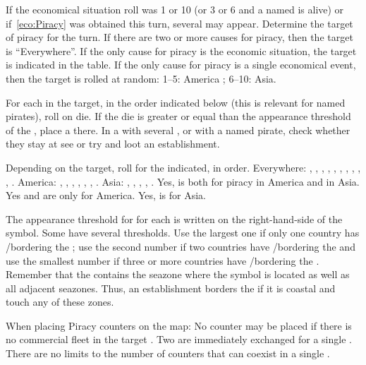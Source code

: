 \aparag If the economical situation roll was 1 or 10 (or 3 or 6 and a
named  \LeaderP is alive) or if~\ref{eco:Piracy} was
obtained this turn, several \PIRATE may appear. Determine the target of
piracy for the turn.
\bparag If there are two or more causes for piracy, then the target is
``Everywhere''.
\bparag If the only cause for piracy is the economic situation, the
target is indicated in the table.
\bparag If the only cause for piracy is a single economical event, then
the target is rolled at random: 1--5: America ; 6--10: Asia.

\aparag For each \STZ in the target, in the order indicated below (this
is relevant for named pirates), roll on die. If the die is greater or
equal than the appearance threshold of the \STZ, place a
\PIRATE\facemoins there.
\bparag In a \STZ with several \PIRATE\faceplus, or with a named pirate,
check whether they stay at see or try and loot an establishment.

 Depending on the target, roll for the \STZ
indicated, in order.
\bparag Everywhere: , , ,
, , , , ,
, , .
\bparag America: , , ,
, , , .
\bparag Asia: , , , ,
.
\bparag Yes,  is both for piracy in America and in
Asia. Yes  and  are only for America. Yes,
 is for Asia.

\label{chEvents:Piracy Level}
The appearance threshold for \PIRATE for each \ROTW \STZ is written on
the right-hand-side of the \STZ symbol.
\bparag Some \STZ have several thresholds. Use the largest one if only
one country has \COL/\TP bordering the \STZ; use the second number if
two countries have \COL/\TP bordering the \STZ and use the smallest
number if three or more countries have \COL/\TP bordering the \STZ.
\bparag Remember that the \STZ contains the seazone where the symbol is
located as well as all adjacent seazones. Thus, an establishment borders
the \STZ if it is coastal and touch any of these zones.

 \label{chEvents:PiracyPlacement} When placing
Piracy counters on the map:
\bparag No \PIRATE counter may be placed if there is no commercial fleet
in the target \STZ.
\bparag Two \PIRATE\facemoins are immediately exchanged for a single
\PIRATE\faceplus.
\bparag There are no limits to the number of \corsaire counters that can
coexist in a single \STZ.




